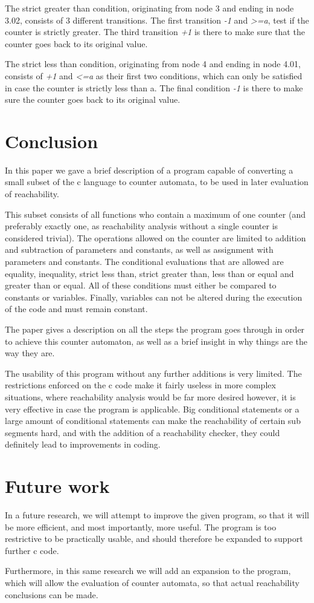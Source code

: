 \documentclass[12pt]{article}
\begin{document}
The strict greater than condition, originating from node 3 and ending in node 3.02, consists of 3 different transitions. The first transition \textit{-1} and \textit{\textgreater =a}, test if the counter is strictly greater. The third transition \textit{+1} is there to make sure that the counter goes back to its original value.

The strict less than condition, originating from node 4 and ending in node 4.01, consists of \textit{+1} and \textit{\textless =a} as their first two conditions, which can only be satisfied in case the counter is strictly less than a. The final condition \textit{-1} is there to make sure the counter goes back to its original value.


\section{Conclusion}
In this paper we gave a brief description of a program capable of converting a small subset of the c language to counter automata, to be used in later evaluation of reachability. 

This subset consists of all functions who contain a maximum of one counter (and preferably exactly one, as reachability analysis without a single counter is considered trivial). The operations allowed on the counter are limited to addition and subtraction of parameters and constants, as well as assignment with parameters and constants. The conditional evaluations that are allowed are equality, inequality, strict less than, strict greater than, less than or equal and greater than or equal. All of these conditions must either be compared to constants or variables. Finally, variables can not be altered during the execution of the code and must remain constant.

The paper gives a description on all the steps the program goes through in order to achieve this counter automaton, as well as a brief insight in why things are the way they are.

The usability of this program without any further additions is very limited. The restrictions enforced on the c code make it fairly useless in more complex situations, where reachability analysis would be far more desired however, it is very effective in case the program is applicable. Big conditional statements or a large amount of conditional statements can make the reachability of certain sub segments hard, and with the addition of a reachability checker, they could definitely lead to improvements in coding.

\section{Future work}
In a future research, we will attempt to improve the given program, so that it will be more efficient, and most importantly, more useful. The program is too restrictive to be practically usable, and should therefore be expanded to support further c code.

Furthermore, in this same research we will add an expansion to the program, which will allow the evaluation of counter automata, so that actual reachability conclusions can be made.
\printbibliography
\end{document}
